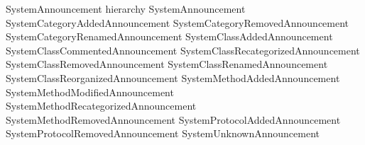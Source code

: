 \documentclass[a4paper,10pt,twoside]{book}
\begin{document}
\begin{code}{SystemAnnouncement hierarchy}
SystemAnnouncement
			SystemCategoryAddedAnnouncement
			SystemCategoryRemovedAnnouncement
			SystemCategoryRenamedAnnouncement
			SystemClassAddedAnnouncement
			SystemClassCommentedAnnouncement
			SystemClassRecategorizedAnnouncement
			SystemClassRemovedAnnouncement
			SystemClassRenamedAnnouncement
			SystemClassReorganizedAnnouncement
			SystemMethodAddedAnnouncement
			SystemMethodModifiedAnnouncement
			SystemMethodRecategorizedAnnouncement
			SystemMethodRemovedAnnouncement
			SystemProtocolAddedAnnouncement
			SystemProtocolRemovedAnnouncement
			SystemUnknownAnnouncement
\end{code}




\ifx\wholebook\relax\else
   
   
\end{document}
